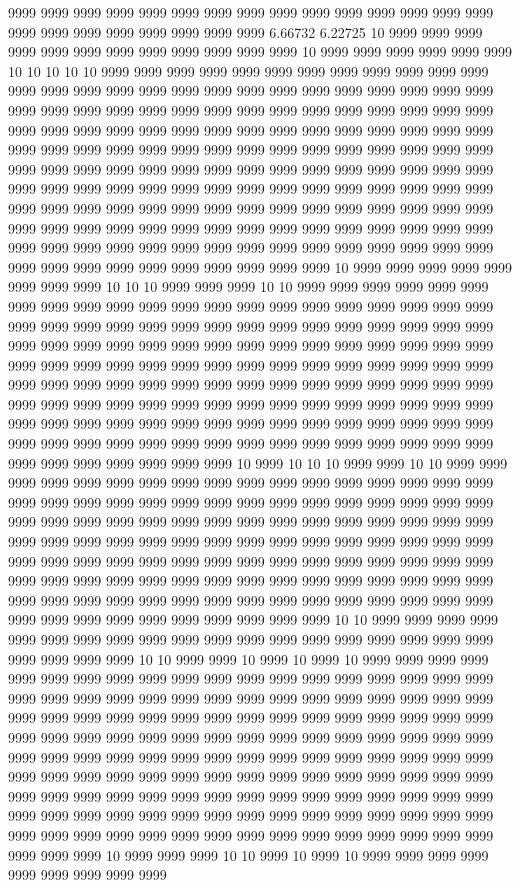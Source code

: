 9999 9999 9999 9999 9999 9999 9999 9999 9999 9999 9999 9999 9999 9999 9999 9999 9999 9999 9999 9999 9999 9999 9999 6.66732 6.22725 10 9999 9999 9999 9999 9999 9999 9999 9999 9999 9999 9999 9999 10 9999 9999 9999 9999 9999 9999 10 10 10 10 10 9999 9999 9999 9999 9999 9999 9999 9999 9999 9999 9999 9999 9999 9999 9999 9999 9999 9999 9999 9999 9999 9999 9999 9999 9999 9999 9999 9999 9999 9999 9999 9999 9999 9999 9999 9999 9999 9999 9999 9999 9999 9999 9999 9999 9999 9999 9999 9999 9999 9999 9999 9999 9999 9999 9999 9999 9999 9999 9999 9999 9999 9999 9999 9999 9999 9999 9999 9999 9999 9999 9999 9999 9999 9999 9999 9999 9999 9999 9999 9999 9999 9999 9999 9999 9999 9999 9999 9999 9999 9999 9999 9999 9999 9999 9999 9999 9999 9999 9999 9999 9999 9999 9999 9999 9999 9999 9999 9999 9999 9999 9999 9999 9999 9999 9999 9999 9999 9999 9999 9999 9999 9999 9999 9999 9999 9999 9999 9999 9999 9999 9999 9999 9999 9999 9999 9999 9999 9999 9999 9999 9999 9999 9999 9999 9999 9999 9999 9999 9999 9999 9999 9999 9999 9999 9999 9999 9999 10 9999 9999 9999 9999 9999 9999 9999 9999 10 10 10 9999 9999 9999 10 10 9999 9999 9999 9999 9999 9999 9999 9999 9999 9999 9999 9999 9999 9999 9999 9999 9999 9999 9999 9999 9999 9999 9999 9999 9999 9999 9999 9999 9999 9999 9999 9999 9999 9999 9999 9999 9999 9999 9999 9999 9999 9999 9999 9999 9999 9999 9999 9999 9999 9999 9999 9999 9999 9999 9999 9999 9999 9999 9999 9999 9999 9999 9999 9999 9999 9999 9999 9999 9999 9999 9999 9999 9999 9999 9999 9999 9999 9999 9999 9999 9999 9999 9999 9999 9999 9999 9999 9999 9999 9999 9999 9999 9999 9999 9999 9999 9999 9999 9999 9999 9999 9999 9999 9999 9999 9999 9999 9999 9999 9999 9999 9999 9999 9999 9999 9999 9999 9999 9999 9999 9999 9999 9999 9999 9999 9999 9999 9999 9999 9999 9999 9999 9999 10 9999 10 10 10 9999 9999 10 10 9999 9999 9999 9999 9999 9999 9999 9999 9999 9999 9999 9999 9999 9999 9999 9999 9999 9999 9999 9999 9999 9999 9999 9999 9999 9999 9999 9999 9999 9999 9999 9999 9999 9999 9999 9999 9999 9999 9999 9999 9999 9999 9999 9999 9999 9999 9999 9999 9999 9999 9999 9999 9999 9999 9999 9999 9999 9999 9999 9999 9999 9999 9999 9999 9999 9999 9999 9999 9999 9999 9999 9999 9999 9999 9999 9999 9999 9999 9999 9999 9999 9999 9999 9999 9999 9999 9999 9999 9999 9999 9999 9999 9999 9999 9999 9999 9999 9999 9999 9999 9999 9999 9999 9999 9999 9999 9999 9999 9999 9999 9999 9999 9999 9999 9999 9999 9999 10 10 9999 9999 9999 9999 9999 9999 9999 9999 9999 9999 9999 9999 9999 9999 9999 9999 9999 9999 9999 9999 9999 9999 9999 10 10 9999 9999 10 9999 10 9999 10 9999 9999 9999 9999 9999 9999 9999 9999 9999 9999 9999 9999 9999 9999 9999 9999 9999 9999 9999 9999 9999 9999 9999 9999 9999 9999 9999 9999 9999 9999 9999 9999 9999 9999 9999 9999 9999 9999 9999 9999 9999 9999 9999 9999 9999 9999 9999 9999 9999 9999 9999 9999 9999 9999 9999 9999 9999 9999 9999 9999 9999 9999 9999 9999 9999 9999 9999 9999 9999 9999 9999 9999 9999 9999 9999 9999 9999 9999 9999 9999 9999 9999 9999 9999 9999 9999 9999 9999 9999 9999 9999 9999 9999 9999 9999 9999 9999 9999 9999 9999 9999 9999 9999 9999 9999 9999 9999 9999 9999 9999 9999 9999 9999 9999 9999 9999 9999 9999 9999 9999 9999 9999 9999 9999 9999 9999 9999 9999 9999 9999 9999 9999 9999 9999 9999 9999 9999 9999 9999 9999 9999 9999 10 9999 9999 9999 10 10 9999 10 9999 10 9999 9999 9999 9999 9999 9999 9999 9999 9999 